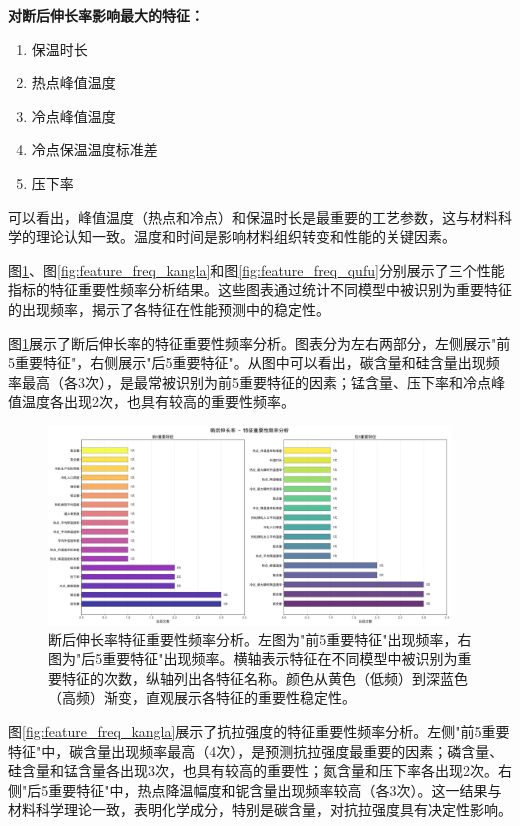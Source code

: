 \documentclass[12pt,a4paper]{article}
\begin{document}
\textbf{对断后伸长率影响最大的特征：}
\begin{enumerate}
\item 保温时长
\item 热点峰值温度
\item 冷点峰值温度
\item 冷点保温温度标准差
\item 压下率
\end{enumerate}

可以看出，峰值温度（热点和冷点）和保温时长是最重要的工艺参数，这与材料科学的理论认知一致。温度和时间是影响材料组织转变和性能的关键因素。

图\ref{fig:feature_freq_duanhou}、图\ref{fig:feature_freq_kangla}和图\ref{fig:feature_freq_qufu}分别展示了三个性能指标的特征重要性频率分析结果。这些图表通过统计不同模型中被识别为重要特征的出现频率，揭示了各特征在性能预测中的稳定性。

图\ref{fig:feature_freq_duanhou}展示了断后伸长率的特征重要性频率分析。图表分为左右两部分，左侧展示"前5重要特征"，右侧展示"后5重要特征"。从图中可以看出，碳含量和硅含量出现频率最高（各3次），是最常被识别为前5重要特征的因素；锰含量、压下率和冷点峰值温度各出现2次，也具有较高的重要性频率。

\begin{figure}[H]
\centering
\includegraphics[width=0.95\textwidth]{fig/feature_frequency_analysis_elongation.png}
\caption{断后伸长率特征重要性频率分析。左图为"前5重要特征"出现频率，右图为"后5重要特征"出现频率。横轴表示特征在不同模型中被识别为重要特征的次数，纵轴列出各特征名称。颜色从黄色（低频）到深蓝色（高频）渐变，直观展示各特征的重要性稳定性。}
\label{fig:feature_freq_duanhou}
\end{figure}

图\ref{fig:feature_freq_kangla}展示了抗拉强度的特征重要性频率分析。左侧"前5重要特征"中，碳含量出现频率最高（4次），是预测抗拉强度最重要的因素；磷含量、硅含量和锰含量各出现3次，也具有较高的重要性；氮含量和压下率各出现2次。右侧"后5重要特征"中，热点降温幅度和铌含量出现频率较高（各3次）。这一结果与材料科学理论一致，表明化学成分，特别是碳含量，对抗拉强度具有决定性影响。
\end{document}

